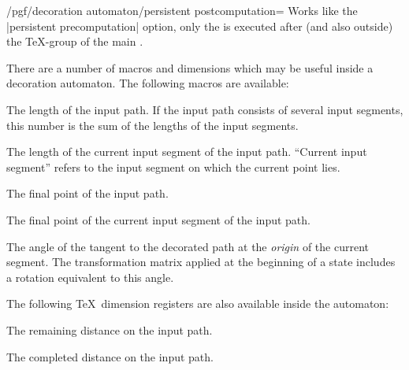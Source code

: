 \begin{command}{\pgfdeclaredecoration{}}
\begin{command}{\state{}}
    \begin{key}{/pgf/decoration automaton/persistent postcomputation=}
      Works like the |persistent precomputation| option, only the
       is executed after (and also outside) the
      \TeX-group of the main .
    \end{key}
    
    There are a number of macros and dimensions which may be useful
    inside a decoration automaton. The following macros are available:
    
    \begin{command}{\pgfdecoratedpathlength}
      The length of the input path. If the input path consists of
      several input segments, this number is the sum of the lengths of the
      input segments. 
    \end{command}
    
    \begin{command}{\pgfdecoratedinputsegmentlength}
      The length of the current input segment of the input path. ``Current
      input segment''  refers to the input segment on which the current point
      lies. 
    \end{command}
		
    \begin{command}{\pgfpointdecoratedpathlast}
      The final point of the input path.
    \end{command}
    
    \begin{command}{\pgfpointdecoratedinputsegmentlast}
      The final point of the current input segment of the input path.
    \end{command}
		
    \begin{command}{\pgfdecoratedangle}
      The angle of the tangent to the decorated path at the \emph{origin}
      of the current segment. The transformation matrix applied at 
      the beginning of a state includes a rotation equivalent to 
      this angle.
    \end{command}
		
    The following \TeX\ dimension registers are also available inside the 
    automaton:
    
    \begin{command}{\pgfdecoratedremainingdistance}
      The remaining distance on the input path.
    \end{command}
		
    \begin{command}{\pgfdecoratedcompleteddistance}
      The completed distance on the input path.
    \end{command}
    

\end{command}
\end{command}
